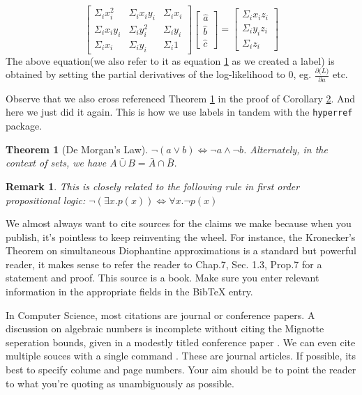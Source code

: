 \documentclass[a4paper]{article}
\newtheorem{theorem}{Theorem}
\newtheorem*{remark}{Remark}
\newcounter{num}
\begin{document}
\begin{equation}
\label{equation1}
\left[
\begin{matrix}
\Sigma_{i}{}x_i^{2} & \Sigma_{i}{}x_iy_i & \Sigma_{i}{}x_i\\
\Sigma_{i}{}x_iy_i & \Sigma_{i}{}y_i^{2} & \Sigma_{i}{}y_i\\
\Sigma_{i}{}x_i & \Sigma_{i}{}y_i & \Sigma_{i}{}1
\end{matrix}
\right]
\left[
\begin{matrix}
\hat{a}\\
\hat{b}\\
\hat{c}
\end{matrix}
\right]
=
\left[
\begin{matrix}
\Sigma_{i}{}x_iz_i\\
\Sigma_{i}{}y_iz_i\\
\Sigma_{i}{}z_i
\end{matrix}
\right]
\end{equation}
The above equation(we also refer to it as equation \hyperref[equation1]{1} as we created a label) is obtained by setting the partial derivatives of the log-likelihood to 0, eg. $\frac{\partial \mathcal(L)}{\partial a}$ etc.\par
Observe that we also cross referenced Theorem \hyperref[theorem1]{1} in the proof of Corollary \hyperref[corollary2]{2}. And here we just did it again. This is how we use labels in tandem with the \texttt{hyperref} package.\par
\begin{theorem}[De Morgan's Law]
\label{theorem3}
$\neg(a\lor b) \iff \neg a \land \neg b$. Alternately, in the context of sets, we have $\bar{A \cup B}= \bar{A}\cap \bar{B}$.
\end{theorem}
\begin{remark}
This is closely related to the following rule in first order propositional logic: $\neg(\exists x.p(x)) \iff \forall x.\neg p(x)$
\end{remark}
We almost always want to cite sources for the claims we make because when you publish, it's pointless to keep reinventing the wheel. For instance, the Kronecker's Theorem on simultaneous Diophantine approximations is a standard but powerful reader, it makes sense to refer the reader to \cite{ref2} Chap.7, Sec. 1.3, Prop.7 for a statement and proof. This source is a book. Make sure you enter relevant information in the appropriate fields in the BibTeX entry.\par
In Computer Science, most citations are journal or conference papers. A discussion on algebraic numbers is incomplete without citing the Mignotte seperation bounds, given in a modestly titled conference paper \cite{ref3}. We can even cite multiple souces with a single command \cite{ref1,ref4}. These are journal articles. If possible, its best to specify colume and page numbers. Your aim should be to point the reader to what you're quoting as unambiguously as possible.\par
\end{document}
